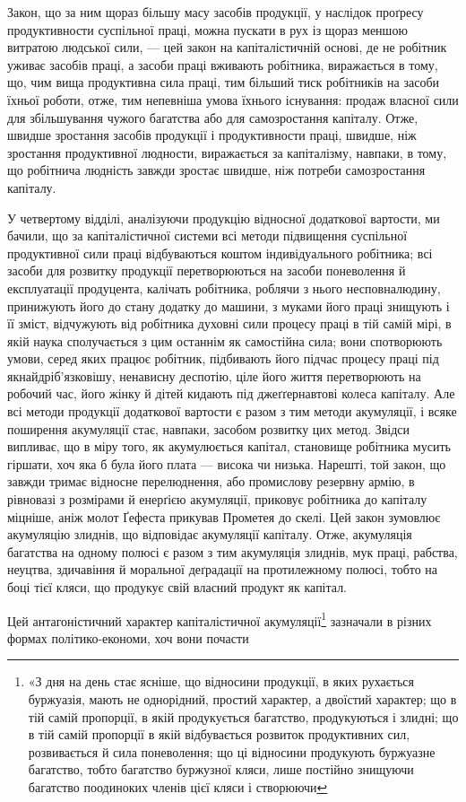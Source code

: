Закон, що за ним щораз більшу масу засобів продукції, у
наслідок проґресу продуктивности суспільної праці, можна пускати
в рух із щораз меншою витратою людської сили, — цей
закон на капіталістичній основі, де не робітник уживає засобів
праці, а засоби праці вживають робітника, виражається в тому,
що, чим вища продуктивна сила праці, тим більший тиск робітників
на засоби їхньої роботи, отже, тим непевніша умова їхнього
існування: продаж власної сили для збільшування чужого багатства
або для самозростання капіталу. Отже, швидше зростання
засобів продукції і продуктивности праці, швидше, ніж
зростання продуктивної людности, виражається за капіталізму,
навпаки, в тому, що робітнича людність завжди зростає швидше,
ніж потреби самозростання капіталу.

У четвертому відділі, аналізуючи продукцію відносної додаткової
вартости, ми бачили, що за капіталістичної системи всі
методи підвищення суспільної продуктивної сили праці відбуваються
коштом індивідуального робітника; всі засоби для розвитку
продукції перетворюються на засоби поневолення й експлуатації
продуцента, калічать робітника, роблячи з нього несповналюдину,
принижують його до стану додатку до машини, з муками
його праці знищують і її зміст, відчужують від робітника духовні
сили процесу праці в тій самій мірі, в якій наука сполучається
з цим останнім як самостійна сила; вони спотворюють умови, серед
яких працює робітник, підбивають його підчас процесу праці
під якнайдріб’язковішу, ненависну деспотію, ціле його життя
перетворюють на робочий час, його жінку й дітей кидають під
джеґґернавтові колеса капіталу. Але всі методи продукції додаткової
вартости є разом з тим методи акумуляції, і всяке поширення
акумуляції стає, навпаки, засобом розвитку цих метод.
Звідси випливає, що в міру того, як акумулюється капітал,
становище робітника мусить гіршати, хоч яка б була його плата —
висока чи низька. Нарешті, той закон, що завжди тримає відносне
перелюднення, або промислову резервну армію, в рівновазі
з розмірами й енерґією акумуляції, приковує робітника до капіталу
міцніше, аніж молот Ґефеста прикував Прометея до скелі.
Цей закон зумовлює акумуляцію злиднів, що відповідає акумуляції
капіталу. Отже, акумуляція багатства на одному полюсі
є разом з тим акумуляція злиднів, мук праці, рабства, неуцтва,
здичавіння й моральної деґрадації на протилежному полюсі,
тобто на боці тієї кляси, що продукує свій власний продукт як
капітал.

Цей антагоністичний характер капіталістичної акумуляції\footnote{
«З дня на день стає ясніше, що відносини продукції, в яких
рухається буржуазія, мають не однорідний, простий характер, а двоїстий
характер; що в тій самій пропорції, в якій продукується багатство,
продукуються і злидні; що в тій самій пропорції в якій відбувається розвиток
продуктивних сил, розвивається й сила поневолення; що ці відносини
продукують буржуазне багатство, тобто багатство буржузної кляси, лише
постійно знищуючи багатство поодиноких членів цієї кляси і створюючи
}
зазначали в різних формах політико-економи, хоч вони почасти